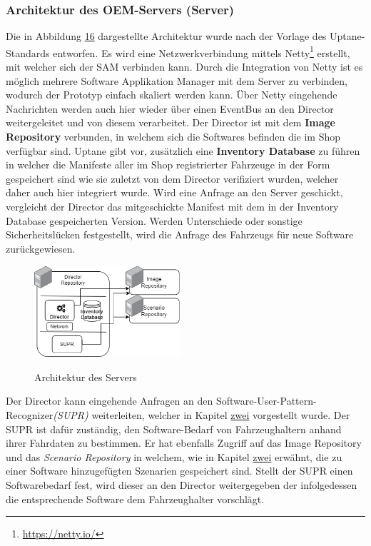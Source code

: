 \subsubsection{Architektur des OEM-Servers (Server)}
Die in Abbildung \hyperref[img:server]{16} dargestellte Architektur wurde nach der Vorlage des Uptane-Standards entworfen. Es wird eine Netzwerkverbindung mittels Netty\footnote{\url{https://netty.io/}} erstellt, mit welcher sich der SAM verbinden kann. Durch die Integration von Netty ist es möglich mehrere Software Applikation Manager mit dem Server zu verbinden, wodurch der Prototyp einfach skaliert werden kann. Über Netty eingehende Nachrichten werden auch hier wieder über einen EventBus an den Director weitergeleitet und von diesem verarbeitet. Der Director ist mit dem \textbf{Image Repository} verbunden, in welchem sich die Softwares befinden die im Shop verfügbar sind. Uptane gibt vor, zusätzlich eine \textbf{Inventory Database} zu führen in welcher die Manifeste aller im Shop registrierter Fahrzeuge in der Form gespeichert sind wie sie zuletzt von dem Director verifiziert wurden, \cite[Vgl. Abschnitt 5.3.2.2]{uptaneDoc} welcher daher auch hier integriert wurde. Wird eine Anfrage an den Server geschickt, vergleicht der Director das mitgeschickte Manifest mit dem in der Inventory Database gespeicherten Version. Werden Unterschiede oder sonstige Sicherheitslücken festgestellt, wird die Anfrage des Fahrzeugs für neue Software zurückgewiesen. \cite[Vgl. Abschnitt 5.3.2.1]{uptaneDoc}
 
\begin{figure}
	\centering
	\includegraphics[width=0.48\textwidth]{pictures/konzept-OEM-vs.png}	
	\label{img:server}
	\caption{Architektur des Servers}
\end{figure}

\noindent
Der Director kann eingehende Anfragen an den Software-User-Pattern-Recognizer\textit{(SUPR)} weiterleiten, welcher in Kapitel \hyperref[fs]{zwei} vorgestellt wurde. Der SUPR ist dafür zuständig, den Software-Bedarf von Fahrzeughaltern anhand ihrer Fahrdaten zu bestimmen. Er hat ebenfalls Zugriff auf das Image Repository und das \textit{Scenario Repository} in welchem, wie in Kapitel \hyperref[konzept]{zwei} erwähnt, die zu einer Software hinzugefügten Szenarien gespeichert sind. Stellt der SUPR einen Softwarebedarf fest, wird dieser an den Director weitergegeben der infolgedessen  die entsprechende Software dem Fahrzeughalter vorschlägt.


